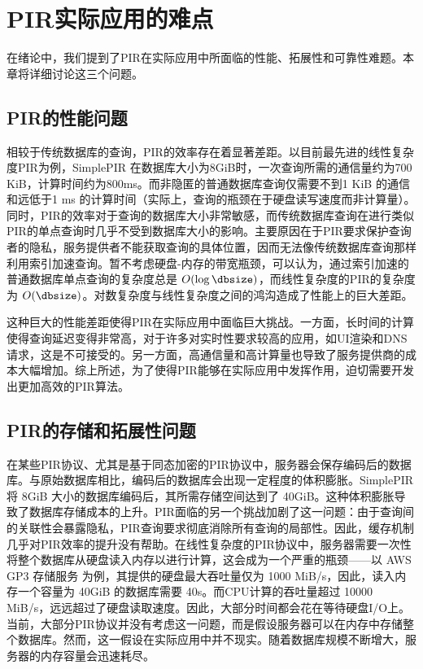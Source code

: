 \section{PIR实际应用的难点}

在绪论中，我们提到了PIR在实际应用中所面临的性能、拓展性和可靠性难题。本章将详细讨论这三个问题。
\subsection{PIR的性能问题}
相较于传统数据库的查询，PIR的效率存在着显著差距。以目前最先进的线性复杂度PIR为例，SimplePIR \cite{SimplePIR} 在数据库大小为8GiB时，一次查询所需的通信量约为700 KiB，计算时间约为800ms。而非隐匿的普通数据库查询仅需要不到1 KiB 的通信和远低于1 ms 的计算时间（实际上，查询的瓶颈在于硬盘读写速度而非计算量）。同时，PIR的效率对于查询的数据库大小非常敏感，而传统数据库查询在进行类似PIR的单点查询时几乎不受到数据库大小的影响。主要原因在于PIR要求保护查询者的隐私，服务提供者不能获取查询的具体位置，因而无法像传统数据库查询那样利用索引加速查询。暂不考虑硬盘-内存的带宽瓶颈，可以认为，通过索引加速的普通数据库单点查询的复杂度总是 $O(\log\dbsize)$，而线性复杂度的PIR的复杂度为 $O(\dbsize)$。对数复杂度与线性复杂度之间的鸿沟造成了性能上的巨大差距。

这种巨大的性能差距使得PIR在实际应用中面临巨大挑战。一方面，长时间的计算使得查询延迟变得非常高，对于许多对实时性要求较高的应用，如UI渲染和DNS请求，这是不可接受的。另一方面，高通信量和高计算量也导致了服务提供商的成本大幅增加。综上所述，为了使得PIR能够在实际应用中发挥作用，迫切需要开发出更加高效的PIR算法。

\subsection{PIR的存储和拓展性问题}
在某些PIR协议、尤其是基于同态加密的PIR协议中，服务器会保存编码后的数据库。与原始数据库相比，编码后的数据库会出现一定程度的体积膨胀。SimplePIR\cite{SimplePIR}将 8GiB 大小的数据库编码后，其所需存储空间达到了 40GiB。这种体积膨胀导致了数据库存储成本的上升。PIR面临的另一个挑战加剧了这一问题：由于查询间的关联性会暴露隐私，PIR查询要求彻底消除所有查询的局部性。因此，缓存机制几乎对PIR效率的提升没有帮助。在线性复杂度的PIR协议中，服务器需要一次性将整个数据库从硬盘读入内存以进行计算，这会成为一个严重的瓶颈——以 AWS GP3 存储服务\cite{AWSEBSGP} 为例，其提供的硬盘最大吞吐量仅为 1000 MiB/s，因此，读入内存一个容量为 40GiB 的数据库需要 40s。而CPU计算的吞吐量超过 10000 MiB/s，远远超过了硬盘读取速度。因此，大部分时间都会花在等待硬盘I/O上。当前，大部分PIR协议并没有考虑这一问题，而是假设服务器可以在内存中存储整个数据库。然而，这一假设在实际应用中并不现实。随着数据库规模不断增大，服务器的内存容量会迅速耗尽。


